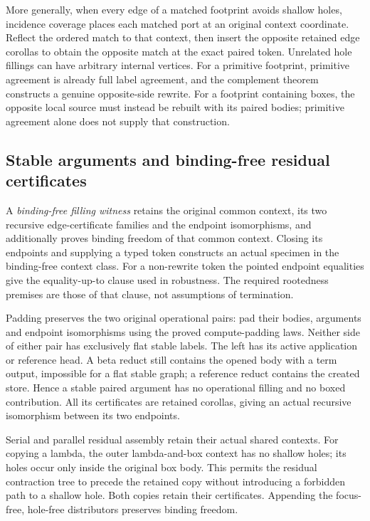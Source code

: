 More generally, when every edge of a matched footprint avoids shallow
holes, incidence coverage places each matched port at an original context
coordinate. Reflect the ordered match to that context, then insert the
opposite retained edge corollas to obtain the opposite match at the exact
paired token. Unrelated hole fillings can have arbitrary internal vertices.
For a primitive footprint, primitive agreement is already full label
agreement, and the complement theorem constructs a genuine opposite-side
rewrite. For a footprint containing boxes, the opposite local source must
instead be rebuilt with its paired bodies; primitive agreement alone does
not supply that construction.

\subsection{Stable arguments and binding-free residual certificates}
A \emph{binding-free filling witness} retains the original common context,
its two recursive edge-certificate families and the endpoint isomorphisms,
and additionally proves binding freedom of that common context. Closing
its endpoints and supplying a typed token constructs an actual specimen
in the binding-free context class. For a non-rewrite token the pointed
endpoint equalities give the equality-up-to clause used in robustness.
The required rootedness premises are those of that clause, not assumptions
of termination.

Padding preserves the two original operational pairs: pad their bodies,
arguments and endpoint isomorphisms using the proved compute-padding laws.
Neither side of either pair has exclusively flat stable labels. The left
has its active application or reference head. A beta reduct still contains
the opened body with a term output, impossible for a flat stable graph;
a reference reduct contains the created store. Hence a stable paired
argument has no operational filling and no boxed contribution. All its
certificates are retained corollas, giving an actual recursive isomorphism
between its two endpoints.

Serial and parallel residual assembly retain their actual shared contexts.
For copying a lambda, the outer lambda-and-box context has no shallow
holes; its holes occur only inside the original box body. This permits the
residual contraction tree to precede the retained copy without introducing
a forbidden path to a shallow hole. Both copies retain their certificates. Appending the focus-free, hole-free
distributors preserves binding freedom.

